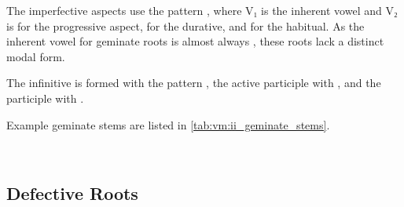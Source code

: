 \documentclass[grammar]{subfiles}
\begin{document}
The imperfective aspects use the pattern , where V₁ is the
inherent vowel and V₂ is  for the progressive aspect,  for the
durative, and  for the habitual. As the inherent vowel for geminate
roots is almost always , these roots lack a distinct modal form.

The infinitive is formed with the pattern , the active participle
with , and the participle with .  

Example geminate stems are listed in \cref{tab:vm:ii_geminate_stems}.

\begin{table}[h!]\small\capstart
  \centering
  \\
  \caption{Pattern II geminate stems \label{tab:vm:ii_geminate_stems}}
\end{table}


\subsection{Defective Roots}
\label{ssec:vm:ii_defective_roots}
\end{document}
